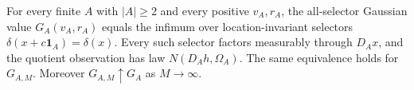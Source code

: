 For every finite \(A\) with \(|A|\geq2\) and every positive \(v_A,r_A\), the all-selector Gaussian value \(G_A(v_A,r_A)\) equals the infimum over location-invariant selectors \(\delta(x+c\mathbf 1_A)=\delta(x)\).  Every such selector factors measurably through \(D_Ax\), and the quotient observation has law \(N(D_Ah,\Omega_A)\).  The same equivalence holds for \(G_{A,M}\).  Moreover \(G_{A,M}\uparrow G_A\) as \(M\to\infty\).